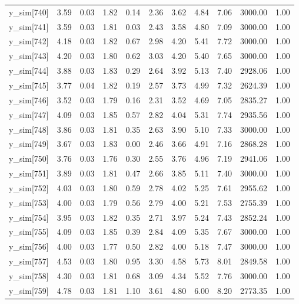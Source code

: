 \begin{table}[ht]
\begin{tabular}{rrrrrrrrrrr}
  y\_sim[740] & 3.59 & 0.03 & 1.82 & 0.14 & 2.36 & 3.62 & 4.84 & 7.06 & 3000.00 & 1.00 \\ 
  y\_sim[741] & 3.59 & 0.03 & 1.81 & 0.03 & 2.43 & 3.58 & 4.80 & 7.09 & 3000.00 & 1.00 \\ 
  y\_sim[742] & 4.18 & 0.03 & 1.82 & 0.67 & 2.98 & 4.20 & 5.41 & 7.72 & 3000.00 & 1.00 \\ 
  y\_sim[743] & 4.20 & 0.03 & 1.80 & 0.62 & 3.03 & 4.20 & 5.40 & 7.65 & 3000.00 & 1.00 \\ 
  y\_sim[744] & 3.88 & 0.03 & 1.83 & 0.29 & 2.64 & 3.92 & 5.13 & 7.40 & 2928.06 & 1.00 \\ 
  y\_sim[745] & 3.77 & 0.04 & 1.82 & 0.19 & 2.57 & 3.73 & 4.99 & 7.32 & 2624.39 & 1.00 \\ 
  y\_sim[746] & 3.52 & 0.03 & 1.79 & 0.16 & 2.31 & 3.52 & 4.69 & 7.05 & 2835.27 & 1.00 \\ 
  y\_sim[747] & 4.09 & 0.03 & 1.85 & 0.57 & 2.82 & 4.04 & 5.31 & 7.74 & 2935.56 & 1.00 \\ 
  y\_sim[748] & 3.86 & 0.03 & 1.81 & 0.35 & 2.63 & 3.90 & 5.10 & 7.33 & 3000.00 & 1.00 \\ 
  y\_sim[749] & 3.67 & 0.03 & 1.83 & 0.00 & 2.46 & 3.66 & 4.91 & 7.16 & 2868.28 & 1.00 \\ 
  y\_sim[750] & 3.76 & 0.03 & 1.76 & 0.30 & 2.55 & 3.76 & 4.96 & 7.19 & 2941.06 & 1.00 \\ 
  y\_sim[751] & 3.89 & 0.03 & 1.81 & 0.47 & 2.66 & 3.85 & 5.11 & 7.40 & 3000.00 & 1.00 \\ 
  y\_sim[752] & 4.03 & 0.03 & 1.80 & 0.59 & 2.78 & 4.02 & 5.25 & 7.61 & 2955.62 & 1.00 \\ 
  y\_sim[753] & 4.00 & 0.03 & 1.79 & 0.56 & 2.79 & 4.00 & 5.21 & 7.53 & 2755.39 & 1.00 \\ 
  y\_sim[754] & 3.95 & 0.03 & 1.82 & 0.35 & 2.71 & 3.97 & 5.24 & 7.43 & 2852.24 & 1.00 \\ 
  y\_sim[755] & 4.09 & 0.03 & 1.85 & 0.39 & 2.84 & 4.09 & 5.35 & 7.67 & 3000.00 & 1.00 \\ 
  y\_sim[756] & 4.00 & 0.03 & 1.77 & 0.50 & 2.82 & 4.00 & 5.18 & 7.47 & 3000.00 & 1.00 \\ 
  y\_sim[757] & 4.53 & 0.03 & 1.80 & 0.95 & 3.30 & 4.58 & 5.73 & 8.01 & 2849.58 & 1.00 \\ 
  y\_sim[758] & 4.30 & 0.03 & 1.81 & 0.68 & 3.09 & 4.34 & 5.52 & 7.76 & 3000.00 & 1.00 \\ 
  y\_sim[759] & 4.78 & 0.03 & 1.81 & 1.10 & 3.61 & 4.80 & 6.00 & 8.20 & 2773.35 & 1.00 \\ 

\end{tabular}
\end{table}
